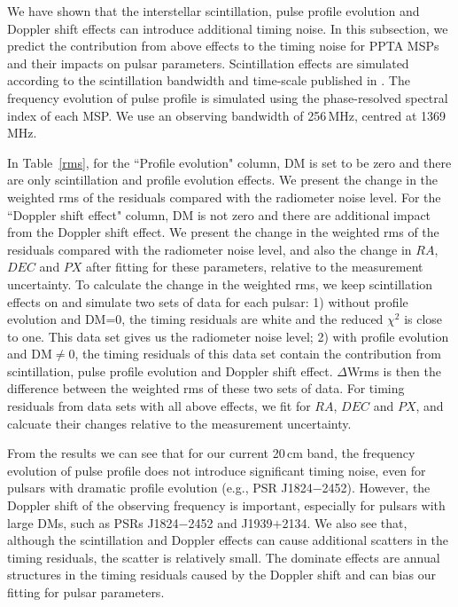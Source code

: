 \documentclass[useAMS,usenatbib]{mn2e}
\begin{document}
We have shown that the interstellar scintillation, pulse profile evolution and Doppler 
shift effects can introduce additional timing noise. In this subsection, we predict 
the contribution from above effects to the timing noise for PPTA MSPs and their impacts on 
pulsar parameters. Scintillation effects are simulated according to the scintillation 
bandwidth and time-scale published in \citet{Keith13}. The frequency evolution of 
pulse profile is simulated using the phase-resolved spectral index of each MSP.
We use an observing bandwidth of 256\,MHz, centred at 1369\,MHz.

In Table~\ref{rms}, for the ``Profile evolution" column, DM is set to be zero and there 
are only scintillation and profile evolution effects. We present the change in the weighted 
rms of the residuals compared with the radiometer noise level. For the ``Doppler shift effect" 
column, DM is not zero and there are additional impact from the Doppler shift effect. 
We present the change in the weighted rms of the residuals compared with the radiometer 
noise level, and also the change in $RA$, $DEC$ and $PX$ after fitting for these parameters, 
relative to the measurement uncertainty. 
%
To calculate the change in the weighted rms, we keep scintillation effects 
on and simulate two sets of data for each pulsar: 
1) without profile evolution and DM=0, the timing residuals are white and the reduced 
$\chi^2$ is close to one. This data set gives us the radiometer noise level; 
2) with profile evolution and DM$\ne$0, the timing residuals of this data 
set contain the contribution from scintillation, pulse profile evolution and 
Doppler shift effect. $\Delta$Wrms is then the difference between the weighted 
rms of these two sets of data.
%
For timing residuals from data sets with all above effects, we fit for $RA$, $DEC$ 
and $PX$, and calcuate their changes relative to the measurement uncertainty.


From the results we can see that for our current 20\,cm band, the frequency evolution 
of pulse profile does not introduce significant timing noise, even for pulsars 
with dramatic profile evolution (e.g., PSR J1824$-$2452). However, the Doppler 
shift of the observing frequency is important, especially for pulsars with 
large DMs, such as PSRs J1824$-$2452 and J1939$+$2134. We also see that, 
although the scintillation and Doppler effects can cause additional scatters 
in the timing residuals, the scatter is relatively small. The dominate 
effects are annual structures in the timing residuals caused by the Doppler 
shift and can bias our fitting for pulsar parameters.
\end{document}
